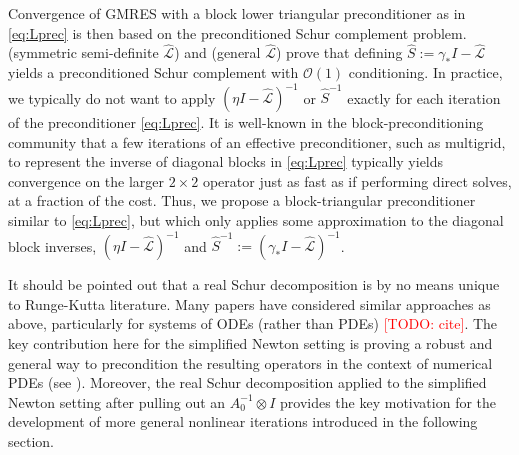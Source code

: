\documentclass[review]{siamart}
\makeatletter
\newcommand{\todo}[1]{\textcolor{red}{[TODO\@: #1]}}
\makeatother
\begin{document}
Convergence of GMRES with a block lower triangular preconditioner as in
\eqref{eq:Lprec} is then based on the preconditioned Schur complement 
problem.  (symmetric semi-definite $\widehat{\mathcal{L}}$)
and  (general $\widehat{\mathcal{L}}$) prove that defining
$\widehat{S}:= \gamma_*I -  \widehat{\mathcal{L}}$ yields a preconditioned
Schur complement with $\mathcal{O}(1)$ conditioning. In practice, we typically
do not want to apply $(\eta I - \widehat{\mathcal{L}})^{-1}$ or
$\widehat{S}^{-1}$ exactly for each iteration of the preconditioner
\eqref{eq:Lprec}. It is well-known in the block-preconditioning community
that a few iterations of an effective preconditioner, such as multigrid,
to represent the inverse of diagonal blocks in \eqref{eq:Lprec} typically
yields convergence on the larger $2\times 2$ operator just as fast as if
performing direct solves, at a fraction of the cost. Thus, we propose
a block-triangular preconditioner similar to \eqref{eq:Lprec}, but which
only applies some approximation to the diagonal block inverses,
$(\eta I - \widehat{\mathcal{L}})^{-1}$ and
$\widehat{S}^{-1} := (\gamma_* I - \widehat{\mathcal{L}})^{-1}$. 

%
\begin{remark}
It should be pointed out that a real Schur decomposition is by no means
unique to Runge-Kutta literature. Many papers have considered similar
approaches as above, particularly for systems of ODEs (rather than PDEs)
\todo{cite}.
The key contribution here for the simplified Newton setting is proving a
robust and general way to precondition the resulting operators in the
context of numerical PDEs (see ). Moreover, the real
Schur decomposition applied to the simplified Newton setting after
pulling out an $A_0^{-1}\otimes I$ provides the key motivation for
the development of more general nonlinear iterations introduced in 
the following section.
\end{remark}
\end{document}
